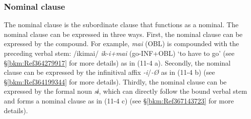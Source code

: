 \subsubsection{Nominal clause}
\label{bkm:Ref365191598}\hypertarget{RefHeadingToc395697254}{}\label{bkm:Ref365541635}
The nominal clause is the subordinate clause that functions as a nominal. The nominal clause can be expressed in three ways. First, the nominal clause can be expressed by the compound. For example, \textit{mai} (OBL) is compounded with the preceding verbal stem: /ikimai/ \textit{ik-i+mai} (go-INF+OBL) ‘to have to go’ (see §\ref{bkm:Ref364279917} for more details) as in (11-4 a). Secondly, the nominal clause can be expressed by the infinitival affix \textit{{}-i}/\textit{{}-Ø} as in (11-4 b) (see §\ref{bkm:Ref364199344} for more details). Thirdly, the nominal clause can be expressed by the formal noun \textit{sɨ}, which can directly follow the bound verbal stem and forms a nominal clause as in (11-4 c) (see §\ref{bkm:Ref367143723} for more details).

\tablefirsthead{}

